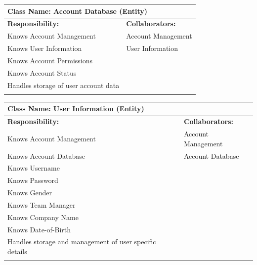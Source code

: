 \documentclass[]{article}
\begin{document}
	\begin{table}[ht]
		\centering
		\begin{tabular}{|p{7cm}|p{7cm}|}
		\hline 
		 \multicolumn{2}{|l|}{\textbf{Class Name:} Account Database (Entity)} \\
		\hline
		\textbf{Responsibility:} & \textbf{Collaborators:} \\
		\hline
			Knows Account Management & Account Management \\
			Knows User Information & User Information \\
			Knows Account Permissions &\\
			Knows Account Status &\\
			Handles storage of user account data &\\
		\vspace{0.1in} & \\
		\hline
		\end{tabular}
	\end{table}

	\begin{table}[ht]
		\centering
		\begin{tabular}{|p{7cm}|p{7cm}|}
		\hline 
		 \multicolumn{2}{|l|}{\textbf{Class Name:} User Information (Entity)} \\
		\hline
		\textbf{Responsibility:} & \textbf{Collaborators:} \\
		\hline

			Knows Account Management & Account Management \\
			Knows Account Database & Account Database \\
			Knows Username &\\
			Knows Password &\\
			Knows Gender &\\
			Knows Team Manager &\\
			Knows Company Name &\\
			Knows Date-of-Birth &\\
			Handles storage and management of user specific details &\\
		\vspace{0.1in} & \\
		\hline
		\end{tabular}
	\end{table}
\end{document}
